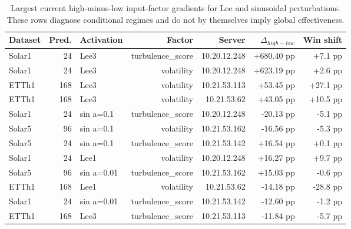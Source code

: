 \begin{table}[t]
\centering
\caption{Largest current high-minus-low input-factor gradients for Lee and sinusoidal perturbations. These rows diagnose conditional regimes and do not by themselves imply global effectiveness.}
\label{tab:factor_gradients}
\begin{tabular}{lrlrrrr}
\toprule
Dataset & Pred. & Activation & Factor & Server & $\Delta_{high-low}$ & Win shift \\
\midrule
Solar1 & 24 & Lee3 & turbulence\_score & 10.20.12.248 & +680.40 pp & +7.1 pp \\
Solar1 & 24 & Lee3 & volatility & 10.20.12.248 & +623.19 pp & +2.6 pp \\
ETTh1 & 168 & Lee3 & volatility & 10.21.53.113 & +53.45 pp & +27.1 pp \\
ETTh1 & 168 & Lee3 & volatility & 10.21.53.62 & +43.05 pp & +10.5 pp \\
Solar1 & 24 & sin a=0.1 & turbulence\_score & 10.20.12.248 & -20.13 pp & -5.1 pp \\
Solar5 & 96 & sin a=0.1 & volatility & 10.21.53.162 & -16.56 pp & -5.3 pp \\
Solar5 & 24 & sin a=0.1 & turbulence\_score & 10.21.53.142 & +16.54 pp & +0.1 pp \\
Solar1 & 24 & Lee1 & volatility & 10.20.12.248 & +16.27 pp & +9.7 pp \\
Solar5 & 96 & sin a=0.01 & turbulence\_score & 10.21.53.162 & +15.03 pp & -0.6 pp \\
ETTh1 & 168 & Lee1 & volatility & 10.21.53.62 & -14.18 pp & -28.8 pp \\
Solar1 & 24 & sin a=0.01 & turbulence\_score & 10.21.53.142 & -12.60 pp & -1.2 pp \\
ETTh1 & 168 & Lee3 & turbulence\_score & 10.21.53.113 & -11.84 pp & -5.7 pp \\
\bottomrule
\end{tabular}
\end{table}
